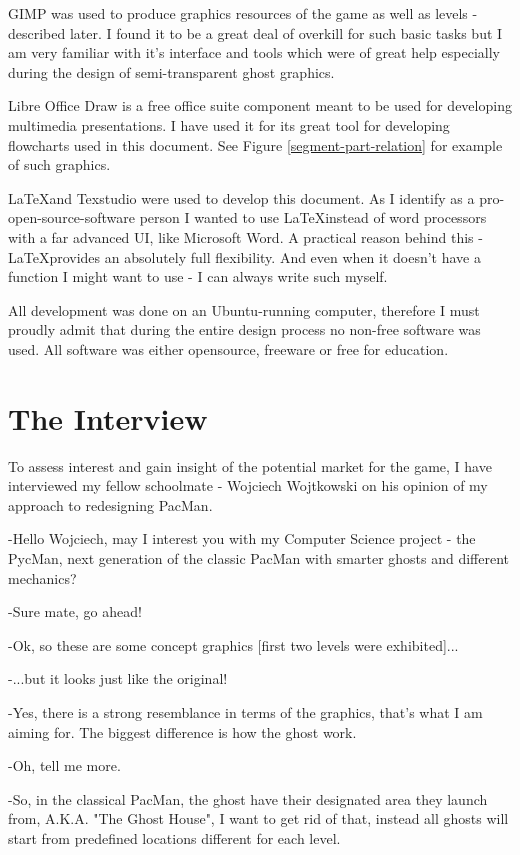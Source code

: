 \documentclass[11pt,a4paper]{report}
\begin{document}
			GIMP was used to produce graphics resources of the game as well as levels - described later. I found it to be a great deal of overkill for such basic tasks but I am very familiar with it's interface and tools which were of great help especially during the design of semi-transparent ghost graphics.
			
			Libre Office Draw is a free office suite component meant to be used for developing multimedia presentations. I have used it for its great tool for developing flowcharts used in this document. See Figure \ref{segment-part-relation} for example of such graphics.
			
			\LaTeX and Texstudio were used to develop this document. As I identify as a pro-open-source-software person I wanted to use \LaTeX instead of word processors with a far advanced UI, like Microsoft Word. A practical reason behind this - \LaTeX provides an absolutely full flexibility. And even when it doesn't have a function I might want to use - I can always write such myself.
			
			All development was done on an Ubuntu-running computer, therefore	
			I must proudly admit that during the entire design process no non-free software was used. All software was either opensource, freeware or free for education.
			\label{freeware}
			
		\section{The Interview}
			\label{interview}
			To assess interest and gain insight of the potential market for the game, I have interviewed my fellow schoolmate - Wojciech Wojtkowski on his opinion of my approach to redesigning PacMan.
			
			-Hello Wojciech, may I interest you with my Computer Science project - the PycMan, next generation of the classic PacMan with smarter ghosts and different mechanics?
			
			-Sure mate, go ahead!
			
			-Ok, so these are some concept graphics [first two levels were exhibited]...
			
			-...but it looks just like the original!
			
			-Yes, there is a strong resemblance in terms of the graphics, that's what I am aiming for. The biggest difference is how the ghost work.
			
			-Oh, tell me more.
			
			-So, in the classical PacMan, the ghost have their designated area they launch from, A.K.A. "The Ghost House", I want to get rid of that, instead all ghosts will start from predefined locations different for each level.
			
\end{document}

